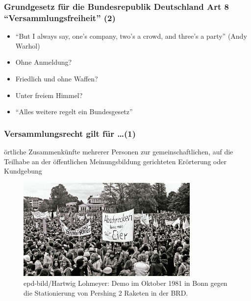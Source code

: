\documentclass[]{beamer}
\begin{document}
	\begin{frame}
	\frametitle{Grundgesetz für die Bundesrepublik Deutschland Art 8 \enquote{Versammlungsfreiheit} (2)}
	\begin{itemize}
		\item \enquote{But I always say, one's company, two's a crowd, and three's a party} (Andy Warhol)
		\item Ohne Anmeldung?
		\item Friedlich und ohne Waffen?
		\item Unter freiem Himmel?
		\item \enquote{Alles weitere regelt ein Bundesgesetz}
	\end{itemize}
	\end{frame}

	\begin{frame}
	\frametitle{Versammlungsrecht gilt für \dots (1)}
	örtliche Zusammenkünfte mehrerer Personen zur gemeinschaftlichen, auf die Teilhabe an der öffentlichen Meinungsbildung gerichteten Erörterung oder Kundgebung
	\begin{figure}[h!]
	\renewcommand{\figurename}{Foto} 
	\includegraphics[width=0.8\textwidth]{images/nicht-fuer-friedensdemo}
	\caption{{\small epd-bild/Hartwig Lohmeyer: Demo im Oktober 1981 in Bonn gegen die Stationierung von Pershing 2 Raketen in der BRD.}}
	\end{figure}	
	\end{frame}
\end{document}
